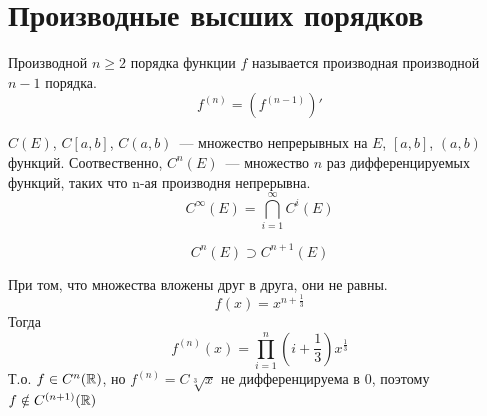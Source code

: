 \section{Производные высших порядков}

\begin{Def}
Производной $n \geqslant 2$ порядка функции $f$ называется производная производной $n - 1$ порядка.
$$f^{(n)} = \left(f^{(n-1)}\right)'$$
\end{Def}

\begin{Def}
$C(E)$, $C[a, b]$, $C(a, b)$~--- множество непрерывных на $E$, $[a, b]$, $(a, b)$ функций. Соотвественно, $C^n(E)$~--- множество $n$ раз дифференцируемых функций, таких что n-ая производня непрерывна.
$$C^\infty(E) = \bigcap_{i=1}^\infty C^i(E)$$
\end{Def}

\begin{assertion}
$$C^n(E) \supset C^{n+1}(E)$$
\end{assertion}
\begin{Rem}
При том, что множества вложены друг в друга, они не равны.
$$f(x) = x^{n + \frac13}$$
Тогда 
$$f^{(n)} (x) = \prod_{i=1}^n \left(i+\frac13\right) x^{\frac13}$$
Т.о. $f \in C^n(\mathbb{R})$, но $f^{(n)} = C \sqrt[3]{x}$ не дифференцируема в $0$, поэтому $f \notin C^{(n+1)}(\mathbb{R})$
\end{Rem}